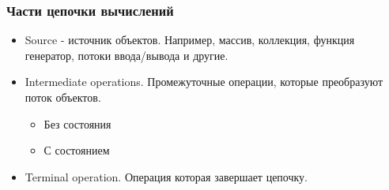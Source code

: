 \begin{frame}
\frametitle{Части цепочки вычислений} %
\begin{itemize}
	\item Source - источник объектов. Например, массив, коллекция, функция генератор, потоки ввода/вывода и другие.
	\item Intermediate operations. Промежуточные операции, которые преобразуют поток объектов.
	\begin{itemize}
		\item Без состояния
		\item С состоянием
	\end{itemize}
	\item Terminal operation. Операция которая завершает цепочку.
\end{itemize}
\end{frame}
